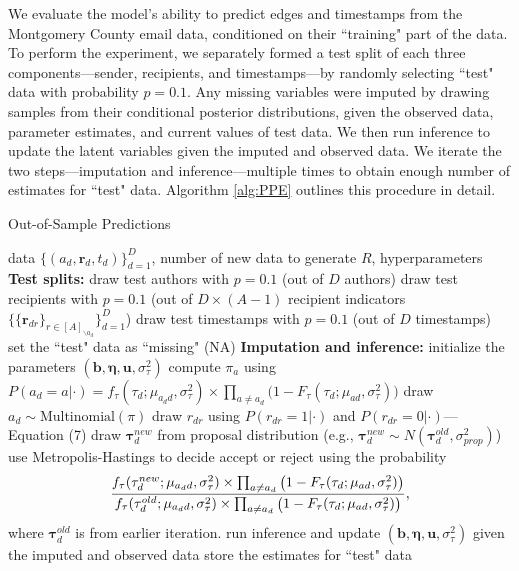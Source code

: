 \documentclass[12pt]{article}
\begin{document}
We evaluate the model's ability to predict edges and timestamps from the Montgomery County email data, conditioned on their ``training" part of the data. To perform the experiment, we separately formed a test split of each three components---sender, recipients, and timestamps---by randomly selecting ``test" data with probability $p=0.1$. Any missing variables were imputed by drawing samples from their conditional posterior distributions, given the observed data, parameter estimates, and current values of test data. We then run inference to update the latent variables given the imputed and observed data. We iterate the two steps---imputation and inference---multiple times to obtain enough number of estimates for ``test" data. Algorithm \ref{alg:PPE} outlines this procedure in detail.	
	\begin{algorithm}[!t]
		\caption{Out-of-Sample Predictions}
		\label{alg:PPE}
		\begin{algorithmic}
			 data $ \{ (a_d, \boldsymbol{r}_d, t_d)\}_{d=1}^D$, 
			number of new data to generate $R$,
			hyperparameters
			\vskip 0.1in
			\textbf{Test splits:}	
			\STATE draw test authors with $p=0.1$ (out of $D$ authors) 
			\STATE draw test recipients
			with $p=0.1$ (out of $D\times (A-1)$ recipient indicators $\{\{\boldsymbol{r}_{dr}\}_{r\in [A]_{\backslash a_d}}\}_{d=1}^D$)
			\STATE draw test timestamps with $p=0.1$  (out of $D$ timestamps) 
			\STATE set the ``test" data as ``missing" (NA)
			\vskip 0.1in
			\textbf{Imputation and inference:}	
			\STATE initialize the parameters $(\boldsymbol{b}, \boldsymbol{\eta}, \boldsymbol{u}, \sigma^2_\tau)$
			\STATE compute $\pi_{a} $ using $P(a_d= a | \cdot)=f_{\tau}(\tau_{d}; \mu_{a_dd}, \sigma_\tau^2)\times \prod_{a\neq a_d}\big(1-F_{\tau}(\tau_{d}; \mu_{a d}, \sigma_\tau^2) \big)$
			\ENDFOR
			\STATE draw $a_d \sim \mbox{Multinomial}(\pi)$
			\ENDIF
			\STATE draw $r_{dr}$ using $P(r_{dr}= 1 | \cdot)$ and $P(r_{dr}= 0| \cdot)$---Equation (7)
			\ENDIF
			\ENDFOR
			\STATE draw $\boldsymbol{\tau}^{new}_d$ from proposal distribution (e.g., $\boldsymbol{\tau}^{new}_d \sim N(\boldsymbol{\tau}^{old}_d, \sigma^2_{prop})$)
			\STATE use Metropolis-Hastings to decide accept or reject using the probability
			\begin{equation*}
			\footnotesize
			\frac{f_{\tau}(\tau^{new}_{d}; \mu_{a_d d}, \sigma_\tau^2)\times \prod_{a\neq a_d}\big(1-F_{\tau}(\tau_{d}; \mu_{a d}, \sigma_\tau^2) \big) }{f_{\tau}(\tau^{old}_{d}; \mu_{a_d d}, \sigma_\tau^2)\times \prod_{a\neq a_d}\big(1-F_{\tau}(\tau_{d}; \mu_{a d}, \sigma_\tau^2) \big)},
			\end{equation*}
			where $\boldsymbol{\tau}^{old}_d$ is from earlier iteration.
			\ENDIF
			\STATE run inference and update $(\boldsymbol{b}, \boldsymbol{\eta},\boldsymbol{u}, \sigma^2_\tau)$ given the imputed and observed data
			\ENDFOR
			\STATE store the estimates for ``test" data
			\ENDFOR
		\end{algorithmic}
	\end{algorithm}
	
\end{document}

